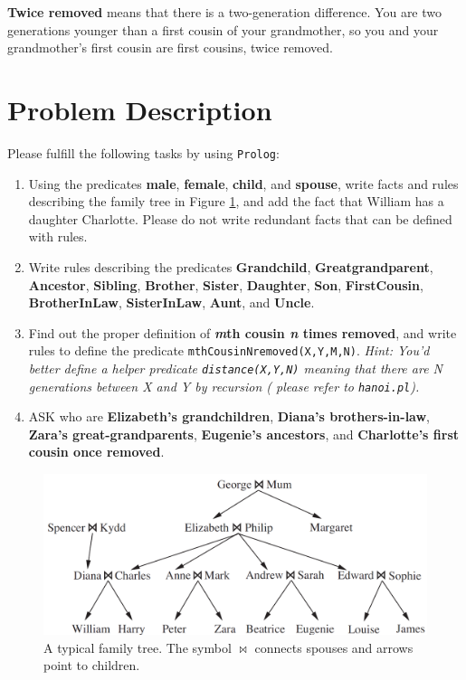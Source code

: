 ﻿\documentclass[a4paper, 11pt]{article}
\begin{document}
\textbf{Twice removed} means that there is a two-generation difference. You are two generations younger than a first cousin of your grandmother, so you and your grandmother's first cousin are first cousins, twice removed.
\section{Problem Description}
Please fulfill the following tasks by using \texttt{Prolog}:
\begin{enumerate}
\item Using the predicates \textbf{male}, \textbf{female}, \textbf{child}, and \textbf{spouse}, write facts and rules describing the family tree in Figure \ref{fig:family}, and add the fact that William has a daughter Charlotte. Please do not write redundant facts that can be defined with rules.

\item Write rules describing the predicates \textbf{Grandchild}, \textbf{Greatgrandparent}, \textbf{Ancestor}, \textbf{Sibling}, \textbf{Brother}, \textbf{Sister}, \textbf{Daughter}, \textbf{Son}, \textbf{FirstCousin}, \textbf{BrotherInLaw}, \textbf{SisterInLaw}, \textbf{Aunt}, and \textbf{Uncle}.

\item Find out the proper definition of \textbf{\emph{m}th cousin \emph{n} times removed}, and write rules to define the predicate \texttt{mthCousinNremoved(X,Y,M,N)}. \emph{Hint: You'd better define a helper predicate \texttt{distance(X,Y,N)} meaning that there are N generations between X and Y by recursion ( please refer to \texttt{hanoi.pl}).}

\item ASK who are \textbf{Elizabeth’s grandchildren}, \textbf{Diana’s brothers-in-law}, \textbf{Zara’s great-grandparents}, \textbf{Eugenie’s ancestors}, and \textbf{Charlotte’s first cousin once removed}.
\end{enumerate}

\begin{figure}[h]  
  \centering
  \includegraphics[width=15cm]{Pic/family}

  \label{fig:family}
  \caption{A typical family tree. The symbol $\bowtie$ connects spouses and arrows point to children.}
\end{figure}
\end{document}
